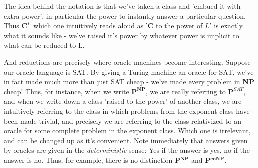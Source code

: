 The idea behind the notation is that we've taken a class and 'embued it with extra power', in particular the power to instantly answer a particular question. Thus $\textbf{C}^L$ which one intuitively reads aloud as '\textbf{C} to the power of $L$' is exactly what it sounds like - we've raised it's power by whatever power is implicit to what can be reduced to L.
\par And reductions are precisely where oracle machines become interesting. Suppose our oracle language is SAT. By giving a Turing machine an oracle for SAT, we've in fact made much more than just SAT cheap - we've made every problem in \textbf{NP} cheap! Thus, for instance, when we write $\textbf{P}^{\textbf{NP}}$, we are really referring to $\textbf{P}^{SAT}$, and when we write down a class 'raised to the power' of another class, we are intuitively referring to the class in which problems from the exponent class have been made trivial, and precisely we are referring to the class relativized to an oracle for some complete problem in the exponent class. Which one is irrelevant, and can be changed up as it's convenient.
Note immediately that answers given by oracles are given in the \textit{deterministic} sense: Yes if the answer is yes, no if the answer is no. Thus, for example, there is no distinction \textbf{P}$^{\textbf{NP}}$ and \textbf{P}$^{\textbf{coNP}}$.


